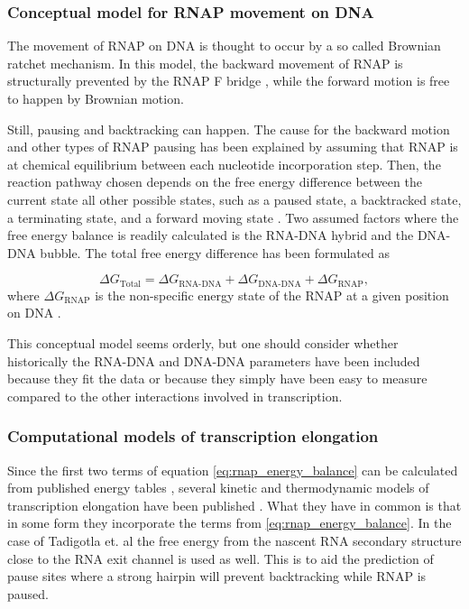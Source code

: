 %

\subsubsection{Conceptual model for RNAP movement on DNA}
The movement of RNAP on DNA is thought to occur by a so called Brownian ratchet
mechanism. In this model, the backward movement of RNAP is structurally
prevented by the RNAP F bridge \cite{bar-nahum_ratchet_2005}, while the forward
motion is free to happen by Brownian motion.

Still, pausing and backtracking can happen. The cause for the backward motion
and other types of RNAP pausing has been explained by assuming that RNAP is at
chemical equilibrium between each nucleotide incorporation step. Then, the
reaction pathway chosen depends on the free energy difference between the
current state all other possible states, such as a paused state, a backtracked
state, a terminating state, and a forward moving state
\cite{greive_thinking_2005}. Two assumed factors where the free energy balance
is readily calculated is the RNA-DNA hybrid and the DNA-DNA bubble. The total
free energy difference has been formulated as

\begin{equation}
	\Delta G_{\text{Total}} = \Delta G_{\text{RNA-DNA}} + \Delta
	G_{\text{DNA-DNA}} + \Delta G_{\text{RNAP}},
	\label{eq:rnap_energy_balance}
\end{equation}
where $\Delta G_{\text{RNAP}}$ is the non-specific energy state of the RNAP at
a given position on DNA \cite{greive_thinking_2005}.

This conceptual model seems orderly, but one should consider whether
historically the RNA-DNA and DNA-DNA parameters have been included because they
fit the data or because they simply have been easy to measure compared to the
other interactions involved in transcription.

\subsubsection{Computational models of transcription elongation}
Since the first two terms of equation \eqref{eq:rnap_energy_balance} can be
calculated from published energy tables \cite{wu_temperature_2002}
\cite{santalucia_thermodynamics_2004}, several kinetic and thermodynamic models
of transcription elongation have been published
\cite{tadigotla_thermodynamic_2006-1} \cite{bai_sequence-dependent_2004}
\cite{guajardo_model_1997}. What they have in common is that in some form they
incorporate the terms from \eqref{eq:rnap_energy_balance}. In the case of
Tadigotla et. al \cite{tadigotla_thermodynamic_2006-1} the free energy from the
nascent RNA secondary structure close to the RNA exit channel is used as
well. This is to aid the prediction of pause sites where a strong hairpin will
prevent backtracking while RNAP is paused.

